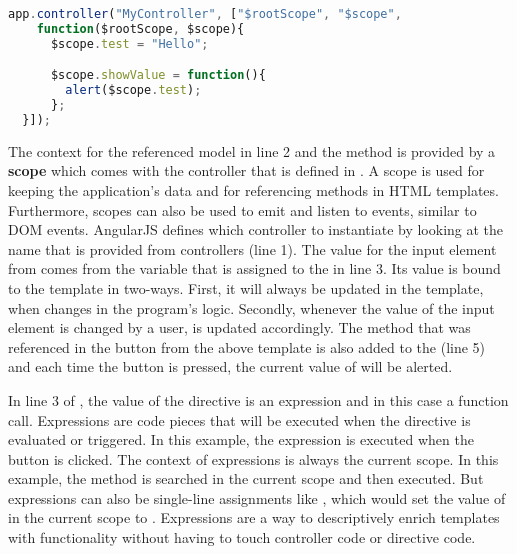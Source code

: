 \begin{lstlisting}[language=JavaScript, caption=A simple AngularJS controller, label=lst:angular-controller]
  app.controller("MyController", ["$rootScope", "$scope",
    function($rootScope, $scope){
      $scope.test = "Hello";

      $scope.showValue = function(){
        alert($scope.test);
      };
  }]);
\end{lstlisting}

The context for the referenced model  in line 2 and the method  is provided by a \textbf{scope} which comes with the controller that is defined in . A scope is used for keeping the application's data and for referencing methods in HTML templates. Furthermore, scopes can also be used to emit and listen to events, similar to DOM events. AngularJS defines which controller to instantiate by looking at the name that is provided from controllers (line 1). The value for the input element from  comes from the variable that is assigned to the  in line 3. Its value is bound to the template in two-ways. First, it will always be updated in the template, when  changes in the program's logic. Secondly, whenever the value of the input element is changed by a user,  is updated accordingly. The method that was referenced in the button from the above template is also added to the  (line 5) and each time the button is pressed, the current value of  will be alerted.

In line 3 of , the value of the  directive is an expression and in this case a function call. Expressions are code pieces that will be executed when the directive is evaluated or triggered. In this example, the expression  is executed when the button is clicked. The context of expressions is always the current scope. In this example, the method  is searched in the current scope and then executed. But expressions can also be single-line assignments like , which would set the value of  in the current scope to . Expressions are a way to descriptively enrich templates with functionality without having to touch controller code or directive code. 